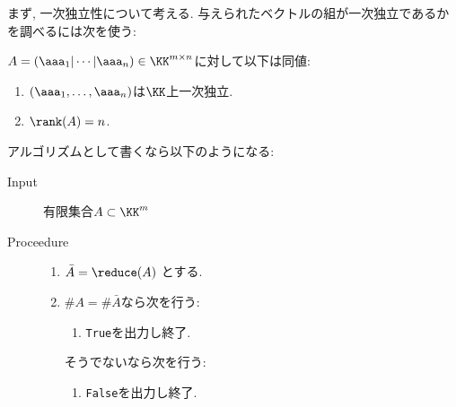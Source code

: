 まず, 一次独立性について考える.
与えられたベクトルの組が一次独立であるかを調べるには次を使う:
\begin{prop}
  $A=(\aaa_1|\cdots|\aaa_n)\in\KK^{m\times n}$に対して以下は同値:
  \begin{enumerate}
  \item $(\aaa_1,\ldots,\aaa_n)$は$\KK$上一次独立.
  \item $\rank(A)=n$.
  \end{enumerate}
\end{prop}
アルゴリズムとして書くなら以下のようになる:
\begin{algorithm}\makebox{}
\begin{description}
\item[Input]
  有限集合$A\subset \KK^m$
\item[Proceedure]\makebox{}
  \begin{enumerate}
  \item
    $\bar A=\reduce(A)$
    とする.
  \item
    $\# A= \#\bar A$なら次を行う:
    \begin{enumerate}
    \item \texttt{True}を出力し終了.
    \end{enumerate}
    そうでないなら次を行う:
    \begin{enumerate}
    \item \texttt{False}を出力し終了.
    \end{enumerate}
  \end{enumerate}
\end{description}
\end{algorithm}

